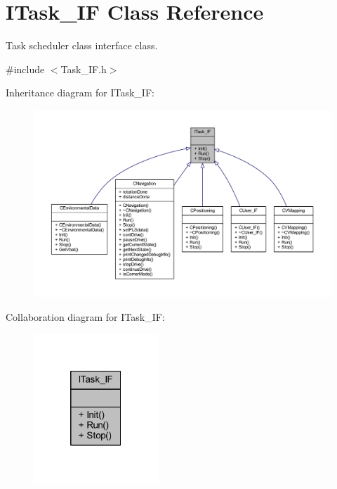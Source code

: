 \hypertarget{class_i_task___i_f}{}\section{I\+Task\+\_\+\+IF Class Reference}
\label{class_i_task___i_f}


Task scheduler class interface class.  




{\ttfamily \#include $<$Task\+\_\+\+I\+F.\+h$>$}



Inheritance diagram for I\+Task\+\_\+\+IF\+:\nopagebreak
\begin{figure}[H]
\begin{center}
\leavevmode
\includegraphics[width=350pt]{class_i_task___i_f__inherit__graph}
\end{center}
\end{figure}


Collaboration diagram for I\+Task\+\_\+\+IF\+:\nopagebreak
\begin{figure}[H]
\begin{center}
\leavevmode
\includegraphics[width=133pt]{class_i_task___i_f__coll__graph}
\end{center}
\end{figure}
